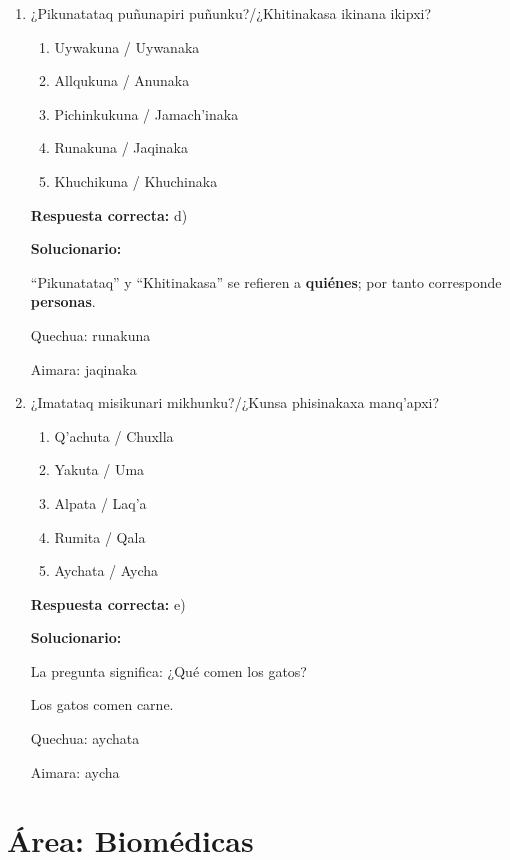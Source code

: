 \begin{enumerate}[resume]
	
	\item ¿Pikunatataq puñunapiri puñunku?/¿Khitinakasa ikinana ikipxi?
	\begin{enumerate}[label=\alph*)]
		\item Uywakuna / Uywanaka
		\item Allqukuna / Anunaka
		\item Pichinkukuna / Jamach'inaka
		\item Runakuna / Jaqinaka
		\item Khuchikuna / Khuchinaka
	\end{enumerate}
	\textbf{Respuesta correcta:} d)
	
	\vspace{2mm}
	\textbf{Solucionario:}
	
	``Pikunatataq'' y ``Khitinakasa'' se refieren a \textbf{quiénes}; por tanto corresponde \textbf{personas}.
	
	Quechua: runakuna
	
	Aimara: jaqinaka
	
	\vspace{6mm}
	
	\item ¿Imatataq misikunari mikhunku?/¿Kunsa phisinakaxa manq'apxi?
	\begin{enumerate}[label=\alph*)]
		\item Q'achuta / Chuxlla
		\item Yakuta / Uma
		\item Alpata / Laq'a
		\item Rumita / Qala
		\item Aychata / Aycha
	\end{enumerate}
	\textbf{Respuesta correcta:} e)
	
	\vspace{2mm}
	\textbf{Solucionario:}
	
	La pregunta significa: ¿Qué comen los gatos?
	
	Los gatos comen carne.
	
	Quechua: aychata
	
	Aimara: aycha
	
	\vspace{6mm}
	
\end{enumerate}



\section*{Área: Biomédicas}

